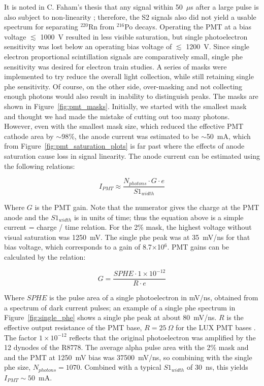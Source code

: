 It is noted in C. Faham's thesis that any signal within 50~$\mu$s after a large pulse is also subject to non-linearity \cite{Faham2014a}; therefore, the S2 signals also did not yield a usable spectrum for separating  $^{220}$Rn from $^{216}$Po decays. Operating the \ac{PMT} at a bias voltage $\lesssim$ 1000~V resulted in less visible saturation, but single photoelectron sensitivity was lost below an operating bias voltage of $\lesssim$ 1200~V. Since single electron proportional scintillation signals are comparatively small, single phe sensitivity was desired for electron train studies. A series of masks were implemented to try reduce the overall light collection, while still retaining single phe sensitivity. Of course, on the other side, over-masking and not collecting enough photons would also result in inability to distinguish peaks. The masks are shown in Figure~\ref{fig:pmt_masks}. Initially, we started with the smallest mask and thought we had made the mistake of cutting out too many photons. However, even with the smallest mask size, which reduced the effective \ac{PMT} cathode area by $\sim$98\%, the anode current was estimated to be $\sim$50~mA, which from Figure~\ref{fig:pmt_saturation_plots} is far past where the effects of anode saturation cause loss in signal linearity. The anode current can be estimated using the following relations:

\begin{equation}
I_{PMT} \approx \frac{N_{photons} \cdot G \cdot e}{S1_{width}}
\end{equation}

Where $G$ is the \ac{PMT} gain. Note that the numerator gives the charge at the \ac{PMT} anode and the $S1_{width}$ is in units of time; thus the equation above is a simple current = charge / time relation. For the 2\% mask, the highest voltage without visual saturation was 1250~mV. The single phe peak was at 35~mV/ns for that bias voltage, which corresponds to a gain of 8.7$\times$10$^{6}$. \ac{PMT} gains can be calculated by the relation:

\begin{equation}
G  = \frac{SPHE \cdot 1\times 10^{-12}} { R \cdot  e}
\end{equation}

Where $SPHE$ is the pulse area of a single photoelectron in mV/ns, obtained from a spectrum of dark current pulses; an example of a single phe spectrum in Figure~\ref{fig:single_phe} shows a single phe peak at about 80~mV/ns.  $R$ is the effective output resistance of the \ac{PMT} base,  $R=25~\Omega$ for the \ac{LUX} \ac{PMT} bases \cite{Faham2014a}. The factor $1\times 10^{-12}$ reflects that the original photoelectron was amplified by the 12 dynodes of the R8778. The average alpha pulse area with the 2\% mask and and the \ac{PMT} at 1250~mV bias was 37500~mV/ns, so combining with the single phe size, $N_{photons} = 1070$. Combined with a typical $S1_{width}$ of 30~ns, this yields $I_{PMT} \sim50$~mA.

